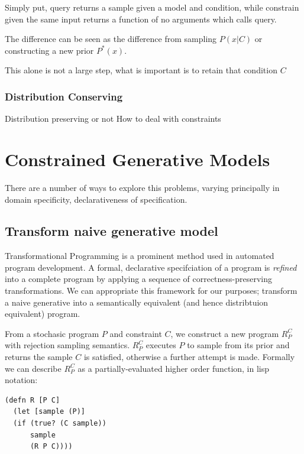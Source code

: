 Simply put, query returns a sample given a model and condition, while constrain given the same input returns a function of no arguments which calls query.

The difference can be seen as the difference from sampling $P(x\vert C)$ or constructing a new prior $P^*(x)$.

This alone is not a large step, what is important is to retain that condition $C$



\subsection{Distribution Conserving}
Distribution preserving or not
How to deal with constraints


\chapter{Constrained Generative Models}
There are a number of ways to explore this problems, varying principally in domain specificity, declarativeness of specification.

\section{Transform naive generative model}
Transformational Programming is a prominent method used in automated program development.
A formal, declarative specifciation of a program is {\em refined} into a complete program by applying a sequence of correctness-preserving transformations.
We can appropriate this framework for our purposes; transform a naive generative into a semantically equivalent (and hence distribtuion equivalent) program.

From a stochasic program $P$ and constraint $C$, we construct a new program $R_P^C$ with rejection sampling semantics.
$R_P^C$ executes $P$ to sample from its prior and returns the sample $C$ is satisfied, otherwise a further attempt is made.
Formally we can describe $R_P^C$ as a partially-evaluated higher order function, in lisp notation:

\begin{verbatim}
(defn R [P C]
  (let [sample (P)]
  (if (true? (C sample))
      sample
      (R P C))))
\end{verbatim}

